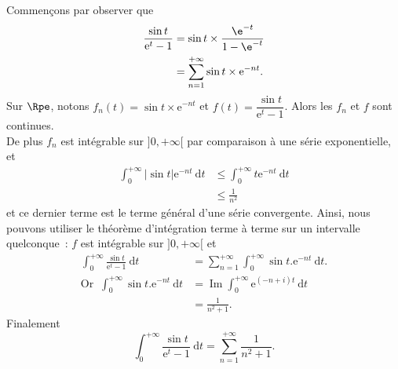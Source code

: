 Commençons par observer que
\begin{align*}
\displaystyle\frac{\sin t}{\mathrm{e}^t-1}&=\sin t\times\displaystyle\frac{\e^{-t}}{1-\e^{-t}}\\
&=\displaystyle\sum_{n=1}^{+\infty} \sin t \times \mathrm{e}^{-n t}.
\end{align*}
Sur $\Rpe$, notons $f_n(t)=\sin t \times \mathrm{e}^{-n t}$ et $f(t)=\dfrac{\sin t}{\mathrm{e}^t-1}$. Alors les $f_n$ et $f$ sont continues.\\
De plus $f_n$ est intégrable sur $] 0,+\infty[$ par comparaison à une série exponentielle,
et
\begin{align*}
\displaystyle\int_0^{+\infty}|\sin t| \mathrm{e}^{-n t} \mathrm{~d} t &\leqslant \displaystyle\int_0^{+\infty} t \mathrm{e}^{-n t} \mathrm{~d} t\\
&\leq\displaystyle\frac{1}{n^2}
 \end{align*}
et ce dernier terme est le terme général d'une série convergente.
Ainsi, nous pouvons utiliser le théorème d'intégration terme à terme sur un intervalle quelconque~: $f$ est intégrable sur $]0,+\infty[$ et
\begin{align*}
\displaystyle\int_0^{+\infty} \displaystyle\frac{\sin t}{\mathrm{e}^t-1} \mathrm{~d} t&=\displaystyle\sum_{n=1}^{+\infty} \displaystyle\int_0^{+\infty} \sin t . \mathrm{e}^{-n t} \mathrm{~d} t.\\
\text{Or }\ \displaystyle\int_0^{+\infty} \sin t . \mathrm{e}^{-n t} \mathrm{~d} t&=\operatorname{Im} \int_0^{+\infty} \mathrm{e}^{(-n+i) t} \mathrm{~d} t\\&
=\displaystyle\frac{1}{n^2+1}.
 \end{align*}
Finalement
$$
\int_0^{+\infty} \frac{\sin t}{\mathrm{e}^t-1} \mathrm{~d} t=\sum_{n=1}^{+\infty} \frac{1}{n^2+1}.
$$
